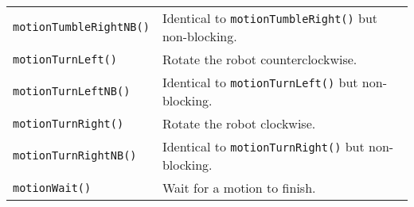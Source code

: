 \begin{table}[!h]
\begin{center}
\begin{tabular}{p{38 mm}p{107 mm}}
\texttt{motionTumbleRightNB()} \dotfill & Identical to \texttt{motionTumbleRight()} but non-blocking. \\
\texttt{motionTurnLeft()} \dotfill & Rotate the robot counterclockwise. \\
\texttt{motionTurnLeftNB()} \dotfill & Identical to \texttt{motionTurnLeft()} but non-blocking. \\
\texttt{motionTurnRight()} \dotfill & Rotate the robot clockwise. \\
\texttt{motionTurnRightNB()} \dotfill & Identical to \texttt{motionTurnRight()} but non-blocking. \\
\texttt{motionWait()} \dotfill & Wait for a motion to finish. \\
\hline
\end{tabular}
\end{center}
\label{mobilec_api_compound}
\end{table}

\clearpage
\newpage




%



































%








